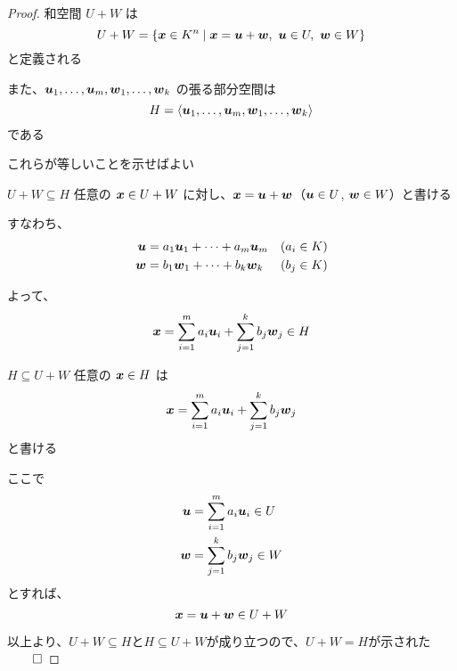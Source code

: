 \documentclass[../../../topic_linear-algebra]{subfiles}
\begin{document}
\begin{proof}
  和空間 $U + W$ は
  \begin{equation*}
    U + W = \{ \vb*{x} \in K^n \mid \vb*{x} = \vb*{u} + \vb*{w},\ \vb*{u} \in U,\ \vb*{w} \in W \}
  \end{equation*}
  と定義される

  また、$\vb*{u}_1, \dots, \vb*{u}_m, \vb*{w}_1, \dots, \vb*{w}_k$ の張る部分空間は
  \begin{equation*}
    H = \langle \vb*{u}_1, \dots, \vb*{u}_m, \vb*{w}_1, \dots, \vb*{w}_k \rangle
  \end{equation*}
  である

  これらが等しいことを示せばよい

  \begin{subpattern}{$U+W \subseteq H$}
    任意の $\vb*{x} \in U + W$ に対し、$\vb*{x} = \vb*{u} + \vb*{w}$（$\vb*{u} \in U$, $\vb*{w} \in W$）と書ける

    すなわち、
    \begin{align*}
      \vb*{u} & = a_1 \vb*{u}_1 + \dots + a_m \vb*{u}_m & (a_i \in K) \\
      \vb*{w} & = b_1 \vb*{w}_1 + \dots + b_k \vb*{w}_k & (b_j \in K)
    \end{align*}

    よって、
    \begin{equation*}
      \vb*{x} = \sum_{i=1}^m a_i \vb*{u}_i + \sum_{j=1}^k b_j \vb*{w}_j \in H
    \end{equation*}
  \end{subpattern}

  \begin{subpattern}{$H \subseteq U + W$}
    任意の $\vb*{x} \in H$ は
    \begin{equation*}
      \vb*{x} = \sum_{i=1}^m a_i \vb*{u}_i + \sum_{j=1}^k b_j \vb*{w}_j
    \end{equation*}
    と書ける

    ここで
    \begin{align*}
      \vb*{u} & = \sum_{i=1}^m a_i \vb*{u}_i \in U \\
      \vb*{w} & = \sum_{j=1}^k b_j \vb*{w}_j \in W
    \end{align*}
    とすれば、
    \begin{equation*}
      \vb*{x} = \vb*{u} + \vb*{w} \in U + W
    \end{equation*}
  \end{subpattern}

  \br

  以上より、$U+W \subseteq H$と$H \subseteq U + W$が成り立つので、$U + W = H$が示された $\qed$
\end{proof}
\end{document}
